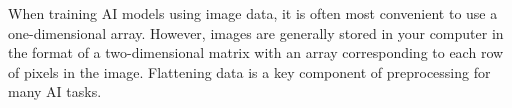 \begin{blocksection}
When training AI models using image data, it is often most convenient to use a one-dimensional array. However, images are generally stored in your computer in the format of a two-dimensional matrix with an array corresponding to each row of pixels in the image. Flattening data is a key component of preprocessing for many AI tasks.
\end{blocksection}